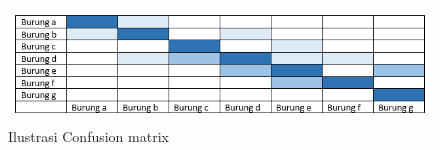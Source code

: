 \begin{figure}[ht]
      \centerline{\includegraphics[width=1\textwidth]
      {figures/cokro/c38}}
      \caption{Ilustrasi Confusion matrix}
      \label{c38}
      \end{figure}
